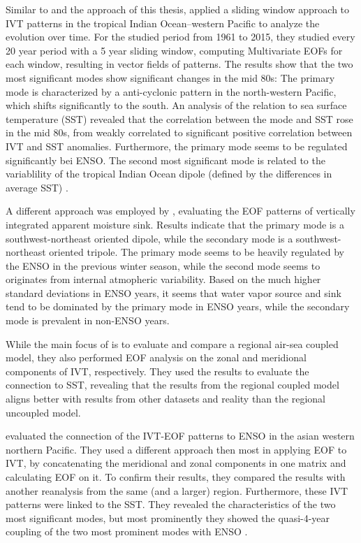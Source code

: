 Similar to \cite{vietinghoff_visual_2021} and the approach of this thesis, \citeauthor{zou_interdecadal_2018} applied a sliding window approach to IVT patterns in the tropical Indian Ocean–western Pacific to analyze the evolution over time. 
For the studied period from 1961 to 2015, they studied every 20 year period with a 5 year sliding window, computing Multivariate EOFs for each window, resulting in vector fields of patterns. 
The results show that the two most significant modes show significant changes in the mid 80s: The primary mode is characterized by a anti-cyclonic pattern in the north-western Pacific, which shifts significantly to the south. 
An analysis of the relation to sea surface temperature (SST) revealed that the correlation between the mode and SST rose in the mid 80s, from weakly correlated to significant positive correlation between IVT and SST anomalies. 
Furthermore, the primary mode seems to be regulated significantly bei ENSO. 
The second most significant mode is related to the variablility of the tropical Indian Ocean dipole (defined by the differences in average SST) \cite{zou_interdecadal_2018}.

A different approach was employed by \cite{zou_investigating_2020}, evaluating the EOF patterns of vertically integrated apparent moisture sink. 
Results indicate that the primary mode is a southwest-northeast oriented dipole, while the secondary mode is a southwest-northeast oriented tripole. 
The primary mode seems to be heavily regulated by the ENSO in the previous winter season, while the second mode seems to originates from internal atmopheric variability. 
Based on the much higher standard deviations in ENSO years, it seems that water vapor source and sink tend to be dominated by the primary mode in ENSO years, while the secondary mode is prevalent in non-ENSO years. 


While the main focus of \cite{yao_simulation_2013} is to evaluate and compare a regional air-sea coupled model, they also performed EOF analysis on the zonal and meridional components of IVT, respectively. 
They used the results to evaluate the connection to SST, revealing that the results from the regional coupled model aligns better with results from other datasets and reality than the regional uncoupled model. 


\citeauthor{li_quasi-4-yr_2012} evaluated the connection of the IVT-EOF patterns to ENSO in the asian western northern Pacific.
They used a different approach then most in applying EOF to IVT, by concatenating the meridional and zonal components in one matrix and calculating EOF on it. 
To confirm their results, they compared the results with another reanalysis from the same (and a larger) region. 
Furthermore, these IVT patterns were linked to the SST. 
They revealed the characteristics of the two most significant modes, but most prominently they showed the quasi-4-year coupling of the two most prominent modes with ENSO \cite{li_quasi-4-yr_2012}. 



